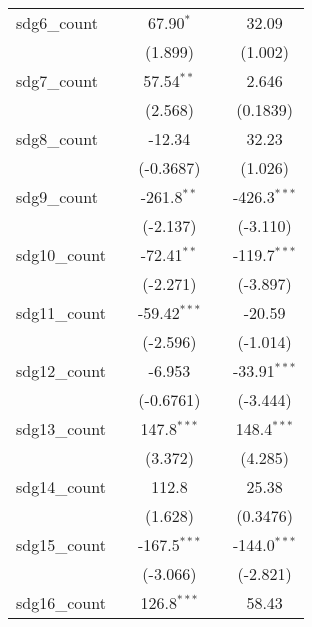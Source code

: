 \begin{tabular}{lcccc}
   sdg6\_count       &                & 67.90$^{*}$    &                & 32.09\\   
                     &                & (1.899)        &                & (1.002)\\   
   sdg7\_count       &                & 57.54$^{**}$   &                & 2.646\\   
                     &                & (2.568)        &                & (0.1839)\\   
   sdg8\_count       &                & -12.34         &                & 32.23\\   
                     &                & (-0.3687)      &                & (1.026)\\   
   sdg9\_count       &                & -261.8$^{**}$  &                & -426.3$^{***}$\\   
                     &                & (-2.137)       &                & (-3.110)\\   
   sdg10\_count      &                & -72.41$^{**}$  &                & -119.7$^{***}$\\   
                     &                & (-2.271)       &                & (-3.897)\\   
   sdg11\_count      &                & -59.42$^{***}$ &                & -20.59\\   
                     &                & (-2.596)       &                & (-1.014)\\   
   sdg12\_count      &                & -6.953         &                & -33.91$^{***}$\\   
                     &                & (-0.6761)      &                & (-3.444)\\   
   sdg13\_count      &                & 147.8$^{***}$  &                & 148.4$^{***}$\\   
                     &                & (3.372)        &                & (4.285)\\   
   sdg14\_count      &                & 112.8          &                & 25.38\\   
                     &                & (1.628)        &                & (0.3476)\\   
   sdg15\_count      &                & -167.5$^{***}$ &                & -144.0$^{***}$\\   
                     &                & (-3.066)       &                & (-2.821)\\   
   sdg16\_count      &                & 126.8$^{***}$  &                & 58.43\\   

\end{tabular}
